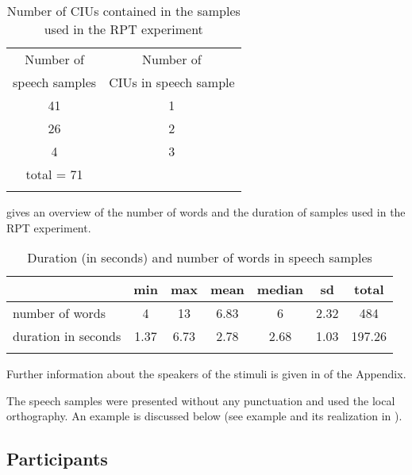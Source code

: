 \begin{table}
	\caption{Number of CIUs contained in the samples used in the RPT experiment}
	\label{Overview stimuli}
	\begin{tabular}{cc}
		\lsptoprule
		Number of  & Number of   \\
		 speech samples &  CIUs in speech sample  \\
		\midrule
		41                       & 1                               \\
		26                       & 2                               \\
		4                        & 3                               \\
		\midrule
		total = 71              	&                                \\
		\lspbottomrule
	\end{tabular}
\end{table}

 gives an overview of the number of words and the duration of samples used in the RPT experiment.

\begin{table}
	\caption{Duration (in seconds) and number of words in speech samples}
	\label{Overvieww stimuli}
	\begin{tabular}{l S[table-format=1.2] S[table-format=2.2] S[table-format=1.2] S[table-format=1.2] S[table-format=1.2] S[table-format=3.2]}
		\lsptoprule
		                    & {min}  & {max}  & {mean} & {median} & {sd}   & {total}  \\ \midrule
		number of words     & 4    & 13   & 6.83 & 6      & 2.32 & 484    \\
		duration in seconds & 1.37 & 6.73 & 2.78 & 2.68   & 1.03 & 197.26 \\
		\lspbottomrule
	\end{tabular}
\end{table}

Further information about the speakers of the stimuli is given in   of the Appendix.


The speech samples were presented without any punctuation and used the local orthography.  An example is discussed below (see example  and its realization in ).





\subsection{Participants}
\label{Participants}



